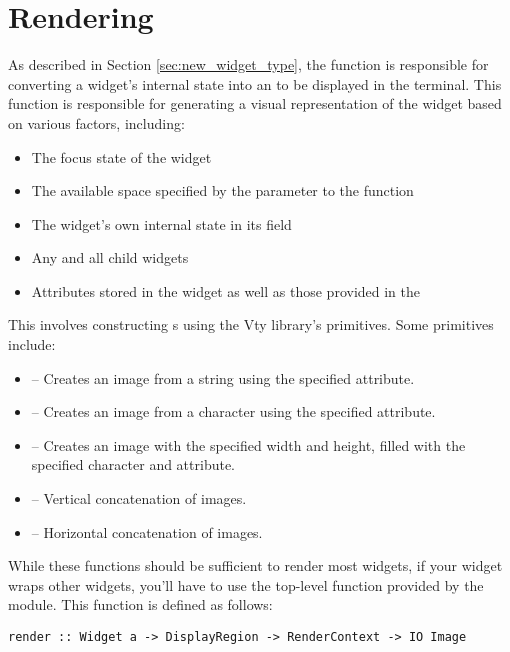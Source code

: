 \section{Rendering}

As described in Section \ref{sec:new_widget_type}, the 
function is responsible for converting a widget's internal state into
an  to be displayed in the terminal.  This function is
responsible for generating a visual representation of the widget based
on various factors, including:

\begin{itemize}
\item The focus state of the widget
\item The available space specified by the  parameter to the
   function
\item The widget's own internal state in its  field
\item Any and all child widgets
\item Attributes stored in the widget as well as those provided in the
\end{itemize}

This involves constructing s using the Vty library's
primitives.  Some primitives include:

\begin{itemize}
\item {} -- Creates an image from a string using the
  specified attribute.
\item {} -- Creates an image from a character using the
  specified attribute.
\item {} -- Creates an image with the specified width and
  height, filled with the specified character and attribute.
\item \fw{<->} -- Vertical concatenation of images.
\item \fw{<|>} -- Horizontal concatenation of images.
\end{itemize}

While these functions should be sufficient to render most widgets, if
your widget wraps other widgets, you'll have to use the top-level
 function provided by the  module.  This function
is defined as follows:

\begin{verbatim}
render :: Widget a -> DisplayRegion -> RenderContext -> IO Image
\end{verbatim}

